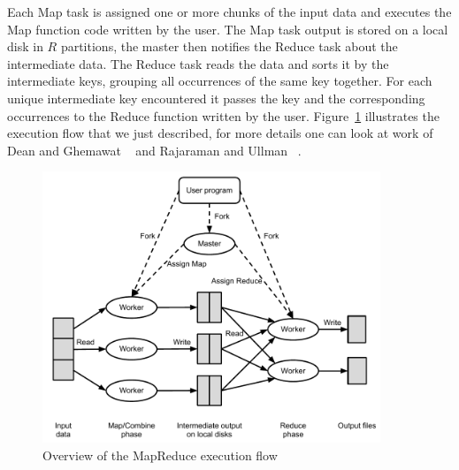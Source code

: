 Each Map task is assigned one or more chunks of the input data and executes the Map function code written by the user. The Map task output is stored on a local disk in $R$ partitions, the master then notifies the Reduce task about the intermediate data. The Reduce task reads the data and sorts it by the intermediate keys, grouping all occurrences of the same key together. For each unique intermediate key encountered it passes the key and the corresponding occurrences to the Reduce function written by the user. Figure~\ref{fig:mapreduce} illustrates the execution flow that we just described, for more details one can look at work of Dean and Ghemawat ~\citep{Dean:2004} and Rajaraman and Ullman ~\citep{Rajaraman:2011MMD}.
\begin{figure}[here]
\centerline{\includegraphics[width=0.9\textwidth]{Figures/MapReduceexecutionflow.pdf}}
\caption{Overview of the MapReduce execution flow}
\label{fig:mapreduce}
\end{figure}
